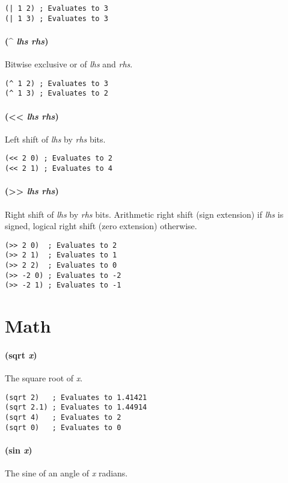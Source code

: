 \documentclass[twoside=false, numbers=noenddot]{scrbook}
\begin{document}
\begin{verbatim}
(| 1 2) ; Evaluates to 3
(| 1 3) ; Evaluates to 3
\end{verbatim}

\paragraph{(\^{} \emph{lhs} \emph{rhs})}
Bitwise exclusive or of \emph{lhs} and \emph{rhs}.

\begin{verbatim}
(^ 1 2) ; Evaluates to 3
(^ 1 3) ; Evaluates to 2
\end{verbatim}

\paragraph{(<< \emph{lhs} \emph{rhs})}
Left shift of \emph{lhs} by \emph{rhs} bits.

\begin{verbatim}
(<< 2 0) ; Evaluates to 2
(<< 2 1) ; Evaluates to 4
\end{verbatim}

\paragraph{(>> \emph{lhs} \emph{rhs})}
Right shift of \emph{lhs} by \emph{rhs} bits.
Arithmetic right shift (sign extension) if \emph{lhs} is signed, logical right shift (zero extension) otherwise.

\begin{verbatim}
(>> 2 0)  ; Evaluates to 2
(>> 2 1)  ; Evaluates to 1
(>> 2 2)  ; Evaluates to 0
(>> -2 0) ; Evaluates to -2
(>> -2 1) ; Evaluates to -1
\end{verbatim}

\section{Math}
\paragraph{(sqrt \emph{x})}
The square root of \emph{x}.

\begin{verbatim}
(sqrt 2)   ; Evaluates to 1.41421
(sqrt 2.1) ; Evaluates to 1.44914
(sqrt 4)   ; Evaluates to 2
(sqrt 0)   ; Evaluates to 0
\end{verbatim}

\paragraph{(sin \emph{x})}
The sine of an angle of \emph{x} radians.
\end{document}
